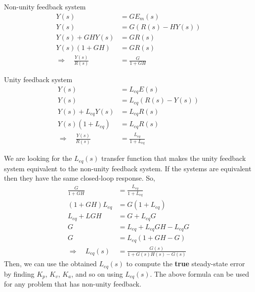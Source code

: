 \documentclass{book}
\begin{document}
\begin{center}
	\hfill
	\begin{minipage}{0.45\textwidth}
		\centering
		Non-unity feedback system
		\begin{align*}
		Y(s) &= G E_m(s) \\
		Y(s) &= G(R(s)-HY(s))\\
		Y(s) + GHY(s) &= GR(s)\\
		Y(s)(1+GH) &= GR(s)\\
		\Rightarrow\quad\frac{Y(s)}{R(s)} &= \frac{G}{1+GH}
		\end{align*}
	\end{minipage}
	\hfill
	\begin{minipage}{0.45\textwidth}
		\centering
		Unity feedback system
		\begin{align*}
		Y(s) &= L_{eq} E(s) \\
		Y(s) &= L_{eq}(R(s)-Y(s))\\
		Y(s) + L_{eq}Y(s) &= L_{eq}R(s)\\
		Y(s)(1+L_{eq}) &= L_{eq}R(s)\\
		\Rightarrow\quad\frac{Y(s)}{R(s)} &= \frac{L_{eq}}{1+L_{eq}}
		\end{align*}
	\end{minipage}
\hfill
\end{center}
We are looking for the $ L_{eq}(s) $ transfer function that makes the unity feedback system equivalent to the non-unity feedback system. If the systems are equivalent then they have the same closed-loop response. So,
\begin{align*}
	\frac{G}{1+GH} &= \frac{L_{eq}}{1+L_{eq}} \\
	(1+GH)L_{eq} &= G(1+L_{eq}) \\
	L_{eq} + LGH &= G + L_{eq}G \\
	G &= L_{eq} + L_{eq}GH - L_{eq}G \\
	G &= L_{eq}(1 + GH - G) \\
	\Rightarrow\quad L_{eq}(s) &= \frac{G(s)}{1 + G(s)H(s) - G(s)}
\end{align*}
Then, we can use the obtained $ L_{eq}(s) $ to compute the \textbf{true} steady-state error by finding $ K_p $, $ K_v $, $ K_a $, and so on using $ L_{eq}(s) $. The above formula can be used for any problem that has non-unity feedback.
\end{document}
